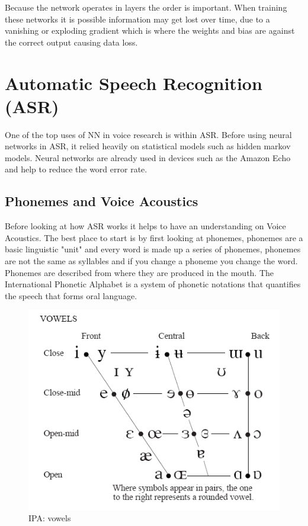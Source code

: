 \documentclass[11pt]{article}
\begin{document}
    Because the network operates in layers the order is important. When training these networks it is possible information may get lost over time, due to a vanishing or exploding gradient which is where the weights and bias are against the correct output causing data loss.
    
    \pagebreak
    
    \section{Automatic Speech Recognition (ASR)}
    
    One of the top uses of NN in voice research is within ASR. Before using neural networks in ASR, it relied heavily on statistical models such as hidden markov models. Neural networks are already used in devices such as the Amazon Echo \cite{SwarupImprovingEmbeddings} and help to reduce the word error rate.
    
    \subsection{Phonemes and Voice Acoustics}
    Before looking at how ASR works it helps to have an understanding on Voice Acoustics. The best place to start is by first looking at phonemes, phonemes are a basic linguistic "unit" and every word is made up a series of phonemes, phonemes are not the same as syllables and if you change a phoneme you change the word. Phonemes are described from where they are produced in the mouth. The International Phonetic Alphabet is a system of phonetic notations that quantifies the speech that forms oral language. 
    
    \begin{figure}[h]
        \centering
        \includegraphics[scale=0.5]{vowels.png}
        \caption{IPA: vowels \cite{InternationalPhoneticAssociationIPA:Association}}
        \label{fig:vowles}
    \end{figure}
    
\end{document}
